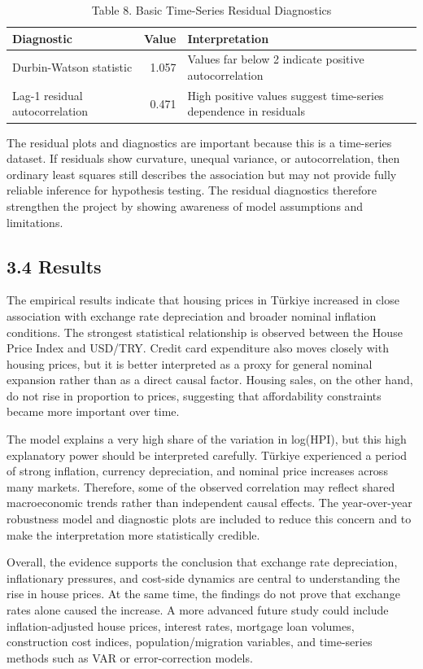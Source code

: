 \documentclass[
  11pt,
  a4paper,
  DIV=11,
  numbers=noendperiod]{scrartcl}
\begin{document}
\begin{longtable}[t]{lrl}
\caption{\label{tab:autocorrelation-diagnostic}Table 8. Basic Time-Series Residual Diagnostics}\\
\toprule
Diagnostic & Value & Interpretation\\
\midrule
Durbin-Watson statistic & 1.057 & Values far below 2 indicate positive autocorrelation\\
Lag-1 residual autocorrelation & 0.471 & High positive values suggest time-series dependence in residuals\\
\bottomrule
\end{longtable}

The residual plots and diagnostics are important because this is a
time-series dataset. If residuals show curvature, unequal variance, or
autocorrelation, then ordinary least squares still describes the
association but may not provide fully reliable inference for hypothesis
testing. The residual diagnostics therefore strengthen the project by
showing awareness of model assumptions and limitations.

\subsection{3.4 Results}\label{results}

The empirical results indicate that housing prices in Türkiye increased
in close association with exchange rate depreciation and broader nominal
inflation conditions. The strongest statistical relationship is observed
between the House Price Index and USD/TRY. Credit card expenditure also
moves closely with housing prices, but it is better interpreted as a
proxy for general nominal expansion rather than as a direct causal
factor. Housing sales, on the other hand, do not rise in proportion to
prices, suggesting that affordability constraints became more important
over time.

The model explains a very high share of the variation in log(HPI), but
this high explanatory power should be interpreted carefully. Türkiye
experienced a period of strong inflation, currency depreciation, and
nominal price increases across many markets. Therefore, some of the
observed correlation may reflect shared macroeconomic trends rather than
independent causal effects. The year-over-year robustness model and
diagnostic plots are included to reduce this concern and to make the
interpretation more statistically credible.

Overall, the evidence supports the conclusion that exchange rate
depreciation, inflationary pressures, and cost-side dynamics are central
to understanding the rise in house prices. At the same time, the
findings do not prove that exchange rates alone caused the increase. A
more advanced future study could include inflation-adjusted house
prices, interest rates, mortgage loan volumes, construction cost
indices, population/migration variables, and time-series methods such as
VAR or error-correction models.
\end{document}
